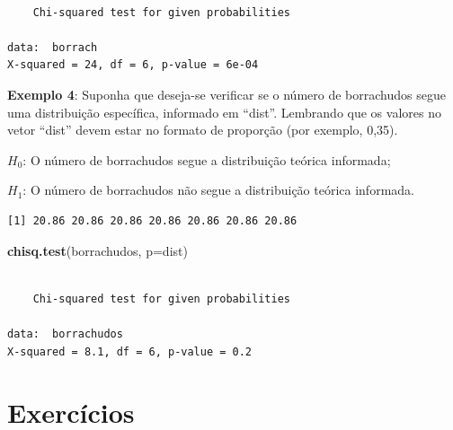 \documentclass[12pt,brazil,oneside]{book}
\newenvironment{Shaded}{\begin{snugshade}}{\end{snugshade}}
\newcommand{\DataTypeTok}[1]{\textcolor[rgb]{0.13,0.29,0.53}{#1}}
\newcommand{\DecValTok}[1]{\textcolor[rgb]{0.00,0.00,0.81}{#1}}
\newcommand{\FloatTok}[1]{\textcolor[rgb]{0.00,0.00,0.81}{#1}}
\newcommand{\KeywordTok}[1]{\textcolor[rgb]{0.13,0.29,0.53}{\textbf{#1}}}
\newcommand{\NormalTok}[1]{#1}
\newcommand{\OperatorTok}[1]{\textcolor[rgb]{0.81,0.36,0.00}{\textbf{#1}}}
\begin{document}
\begin{verbatim}

    Chi-squared test for given probabilities

data:  borrach
X-squared = 24, df = 6, p-value = 6e-04
\end{verbatim}

\textbf{Exemplo 4}: Suponha que deseja-se verificar se o número de borrachudos segue uma distribuição específica, informado em ``dist''. Lembrando que os valores no vetor ``dist'' devem estar no formato de proporção (por exemplo, 0,35).

\(H_0\): O número de borrachudos segue a distribuição teórica informada;

\(H_1\): O número de borrachudos não segue a distribuição teórica informada.

\begin{Shaded}
\end{Shaded}

\begin{verbatim}
[1] 20.86 20.86 20.86 20.86 20.86 20.86 20.86
\end{verbatim}

\begin{Shaded}
\begin{Highlighting}[]
\KeywordTok{chisq.test}\NormalTok{(borrachudos, }\DataTypeTok{p=}\NormalTok{dist)}
\end{Highlighting}
\end{Shaded}

\begin{verbatim}

    Chi-squared test for given probabilities

data:  borrachudos
X-squared = 8.1, df = 6, p-value = 0.2
\end{verbatim}

\hypertarget{exercicios-3}{%
\section{Exercícios}\label{exercicios-3}}
\end{document}
